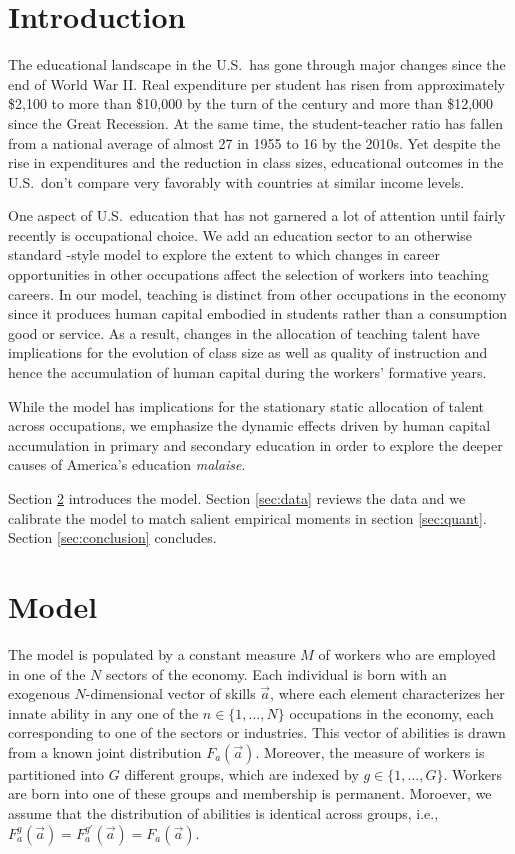 \documentclass[onehalfspacing,11pt]{article}
\begin{document}
\section{Introduction}
The educational landscape in the U.S.~has gone through major changes since the end of World War II. Real expenditure per student has risen from approximately \$2,100 to more than \$10,000 by the turn of the century and more than \$12,000 since the Great Recession. At the same time, the student-teacher ratio has fallen from a national average of almost 27 in 1955 to 16 by the 2010s. Yet despite the rise in expenditures and the reduction in class sizes, educational outcomes in the U.S.~don't compare very favorably with countries at similar income levels.

One aspect of U.S.~education that has not garnered a lot of attention until fairly recently is occupational choice. We add an education sector to an otherwise standard \cite{Hsieh:2018}-style model to explore the extent to which changes in career opportunities in other occupations affect the selection of workers into teaching careers. In our model, teaching is distinct from other occupations in the economy since it produces human capital embodied in students rather than a consumption good or service. As a result, changes in the allocation of teaching talent have implications for the evolution of class size as well as quality of instruction and hence the accumulation of human capital during the workers' formative years.

While the model has implications for the stationary static allocation of talent across occupations, we emphasize the dynamic effects driven by human capital accumulation in primary and secondary education in order to explore the deeper causes of America's education \textit{malaise}.

Section \ref{sec:model} introduces the model. Section \ref{sec:data} reviews the data and we calibrate the model to match salient empirical moments in section \ref{sec:quant}. Section \ref{sec:conclusion} concludes.

\section{Model}\label{sec:model}
The model is populated by a constant measure $M$ of workers who are employed in one of the $N$ sectors of the economy. Each individual is born with an exogenous $N$-dimensional vector of skills $\vec{a}$, where each element characterizes her innate ability in any one of the $n \in \{1,\ldots,N\}$ occupations in the economy, each corresponding to one of the sectors or industries. This vector of abilities is drawn from a known joint distribution $F_a(\vec{a})$. Moreover, the measure of workers is partitioned into $G$ different groups, which are indexed by $g \in \{1,\dots,G \}$. Workers are born into one of these groups and membership is permanent. Moroever, we assume that the distribution of abilities is identical across groups, i.e., $F_a^g(\vec{a}) = F_a^{g'}(\vec{a}) = F_a(\vec{a})$.
\end{document}
